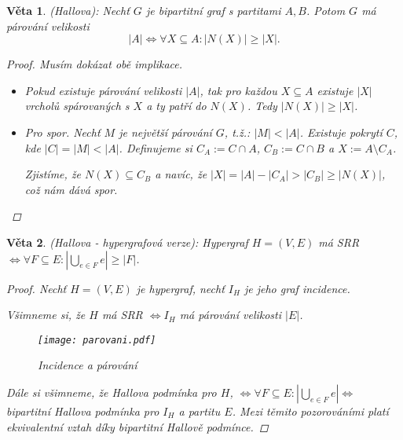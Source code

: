 \documentclass[10pt,a4paper]{article}
\newtheorem{veta}{Věta}
\newcommand\makesmall{\fontsize{8pt}{11pt}\selectfont}
\begin{document}
\begin{veta} (Hallova): \normalfont
    Nechť $G$ je bipartitní graf s partitami $A, B$. Potom $G$ má párování velikosti $$|A|\iff \forall X \subseteq A : |N(X)| \geq |X|.$$
    \begin{proof}
        Musím dokázat obě implikace.
        \begin{itemize}
            \item [$\implies$] Pokud existuje párování velikosti $|A|$, tak pro každou $X\subseteq A$ existuje $|X|$ vrcholů spárovaných s $X$ a ty patří do $N(X)$. 
            Tedy $|N(X)| \geq |X|$.
            \item [$\Longleftarrow$] Pro spor. Nechť $M$ je největší párování $G$, t.ž.: $|M| < |A|$. 
            Existuje pokrytí $C$, kde $|C| = |M| < |A|$.
            Definujeme si $C_A := C\cap A$, $C_B:= C\cap B$ a $X:= A\setminus C_A$.
            
            Zjistíme, že $N(X) \subseteq C_B$ a navíc, že $|X| = |A| - |C_A| > |C_B| \geq |N(X)|$, což nám dává spor.
        \end{itemize}
    \end{proof}
\end{veta}
\begin{veta} (Hallova - hypergrafová verze): \normalfont 
    Hypergraf $H=(V,E)$ má SRR $\displaystyle\iff \forall F\subseteq E: \left|\bigcup_{e\in F}e\right| \geq |F|$.
    \begin{proof}
        Nechť $H=(V,E)$ je hypergraf, nechť $I_H$ je jeho graf incidence.

        Všimneme si, že $H$ má SRR $\iff I_H$ má párování velikosti $|E|$.

        \begin{figure}[h]
            \caption{\makesmall\textit{Incidence a párování}}
            \centering
            \texttt{[image: parovani.pdf]}
        \end{figure}

        Dále si všimneme, že Hallova podmínka pro $H$,  $\displaystyle\iff \forall F\subseteq E: \left|\bigcup_{e\in F}e\right| \iff$ bipartitní Hallova podmínka pro $I_H$ a partitu $E$.
        Mezi těmito pozorováními platí ekvivalentní vztah díky bipartitní Hallově podmínce.
    \end{proof}
\end{veta}
\end{document}
